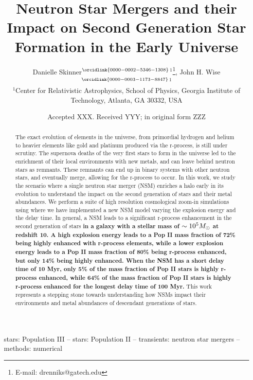 \documentclass[fleqn,usenatbib]{mnras}
\title[Neutron Star Mergers from Population III Stars]{Neutron Star Mergers and their Impact on Second Generation Star Formation in the Early Universe}
\author[Skinner \& Wise]{
Danielle Skinner$^{\orcidlink{0000-0002-5346-1308}}$$^{1}$\thanks{E-mail: drenniks@gatech.edu},
John H. Wise$^{\orcidlink{0000-0003-1173-8847}}$$^{1}$
\\
$^{1}$Center for Relativistic Astrophysics, School of Physics, Georgia Institute of Technology, Atlanta, GA 30332, USA\\
}
\date{Accepted XXX. Received YYY; in original form ZZZ}
\begin{document}
\label{firstpage}
\pagerange{\pageref{firstpage}--\pageref{lastpage}}
\maketitle

\begin{abstract}
	The exact evolution of elements in the universe, from primordial hydrogen and helium to heavier elements like gold and platinum produced via the r-process, is still under scrutiny. The supernova deaths of the very first stars to form in the universe led to the enrichment of their local environments with new metals, and can leave behind neutron stars as remnants. These remnants can end up in binary systems with other neutron stars, and eventually merge, allowing for the r-process to occur. In this work, we study the scenario where a single neutron star merger (NSM) enriches a halo early in its evolution to understand the impact on the second generation of stars and their metal abundances. We perform a suite of high resolution cosmological zoom-in simulations using \enzo{} where we have implemented a new NSM model varying the explosion energy and the delay time. In general, a NSM leads to a significant r-process enhancement in the second generation of stars \textbf{in a galaxy with a stellar mass of $\sim 10^5 \Ms$ at redshift 10.  A high explosion energy leads to a Pop II mass fraction of 72\% being highly enhanced with r-process elements, while a lower explosion energy leads to a Pop II mass fraction of 80\% being r-process enhanced, but only 14\% being highly enhanced. When the NSM has a short delay time of 10 Myr, only 5\% of the mass fraction of Pop II stars is highly r-process enhanced, while 64\% of the mass fraction of Pop II stars is highly r-process enhanced for the longest delay time of 100 Myr.} This work represents a stepping stone towards understanding how NSMs impact their environments and metal abundances of descendant generations of stars.
\end{abstract}

\begin{keywords}
stars: Population III -- stars: Population II -- transients: neutron star mergers -- methods: numerical
\end{keywords}


\end{document}
